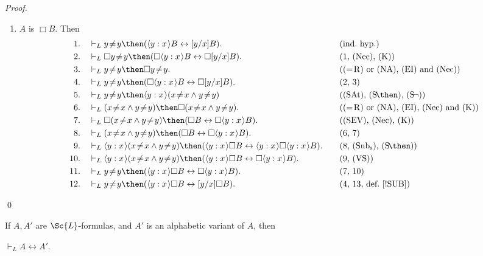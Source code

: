 \documentclass[11pt]{woarticle}
\theoremstyle{break}
\theoremstyle{nonumberplain}
\newcommand{\1}{\;\,|\;\,}
\renewcommand{\t}[1]{\ensuremath{\langle #1  \makebox[.2ex]{}\rangle}}
\newcommand{\T}[1]{\ensuremath{(\mathrm{ #1})}}
\newcommand{\itemT}[1]{\item[\T{#1}]}
\begin{document}
\begin{proof}
\begin{enumerate}
  \item $A$ is $\Box B$.\; Then
     \begin{alignat*}{2}
       1.\quad& \vdash_L y\!\not=\!y \then (\t{y:x}B \leftrightarrow [y/x]B).
       &\quad&\text{(ind.~hyp.)}\\
       2.\quad& \vdash_L \Box y\!\not=\!y \then (\Box\t{y:x}B \leftrightarrow
       \Box [y/x]B). && \text{(1, \T{Nec}, \T{K})}\\
       3.\quad& \vdash_L y\!\not=\!y \then \Box y\!\not=\!y.
       && \text{(\T{=\!R} or \T{NA}, \T{EI} and \T{Nec})}\\
       4.\quad& \vdash_L y\!\not=\!y \then (\Box\t{y:x}B \leftrightarrow
       \Box [y/x]B). && \text{(2, 3)}\\
       5.\quad& \vdash_L y\!\not=\!y \then \t{y:x}(x\!\not=\!x \land y\!\not=\!y)
       && \text{(\T{SAt}, \T{S\!\then}, \T{S\!\neg})}\\
       6.\quad& \vdash_L (x\!\not=\!x \land y\!\not=\!y) \then 
       \Box(x\!\not=\!x \land y\!\not=\!y). && \text{(\T{=\!R} or \T{NA}, \T{EI}, \T{Nec} and \T{K})}\\
       7.\quad& \vdash_L \Box(x\!\not=\!x \land y\!\not=\!y) 
       \then (\Box B \leftrightarrow \Box \t{y:x}B).
       && \text{(\T{SEV}, \T{Nec}, \T{K})}\\
       8.\quad& \vdash_L (x\!\not=\!x \land y\!\not=\!y) \then
       (\Box B \leftrightarrow \Box \t{y:x}B). && \text{(6, 7)}\\
       9.\quad& \vdash_L \t{y:x}(x\!\not=\!x \land y\!\not=\!y) \then 
       (\t{y:x}\Box B \leftrightarrow \t{y:x} \Box \t{y:x}B). 
       && \text{(8, \T{Sub_s}, \T{S\!\then})}\\
       10.\quad& \vdash_L \t{y:x}(x\!\not=\!x \land y\!\not=\!y) \then 
       (\t{y:x}\Box B \leftrightarrow \Box \t{y:x}B). 
       && \text{(9, \T{VS})}\\
       11.\quad& \vdash_L y\!\not=\!y \then
       (\t{y:x}\Box B \leftrightarrow \Box \t{y:x}B). && \text{(7, 10)}\\
       12.\quad& \vdash_L y\!\not=\!y \then (\t{y:x} \Box B \leftrightarrow
       [y/x]\Box B). && \text{(4, 13, def.~\ref{!SUB})}
    \end{alignat*}
   \end{enumerate}
   
   \qed

\end{proof}

\begin{lemma}\label{alphasyn-s}
  If $A,A'$ are $\Sc{L}$-formulas, and $A'$ is an alphabetic variant of
  $A$, then
  \begin{semantics}
    \itemT{AC} $\vdash_{L} A \leftrightarrow A'$.
  \end{semantics}
\end{lemma}
\end{document}
